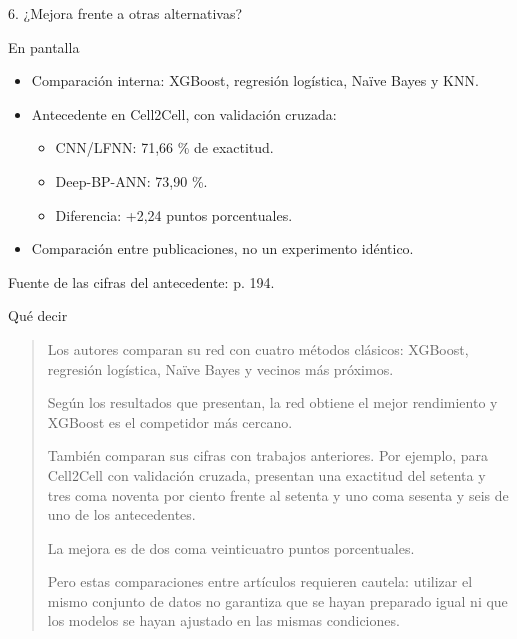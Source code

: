 \documentclass[presentation]{beamer}
\begin{document}
\begin{frame}[label={sec:org3dd62b4}]{6. ¿Mejora frente a otras alternativas?}
\begin{block}{En pantalla}
\begin{itemize}
\item Comparación interna: XGBoost, regresión logística, Naïve Bayes y KNN.
\item Antecedente en Cell2Cell, con validación cruzada:
\begin{itemize}
\item CNN/LFNN: 71,66 \% de exactitud.
\item Deep-BP-ANN: 73,90 \%.
\item Diferencia: +2,24 puntos porcentuales.
\end{itemize}
\item Comparación entre publicaciones, no un experimento idéntico.
\end{itemize}

Fuente de las cifras del antecedente: p. 194.
\end{block}
\begin{block}{Qué decir}
\begin{quote}
Los autores comparan su red con cuatro métodos clásicos: XGBoost, regresión logística, Naïve Bayes y vecinos más próximos.

Según los resultados que presentan, la red obtiene el mejor rendimiento y XGBoost es el competidor más cercano.

También comparan sus cifras con trabajos anteriores. Por ejemplo, para Cell2Cell con validación cruzada, presentan una exactitud del setenta y tres coma noventa por ciento frente al setenta y uno coma sesenta y seis de uno de los antecedentes.

La mejora es de dos coma veinticuatro puntos porcentuales.

Pero estas comparaciones entre artículos requieren cautela: utilizar el mismo conjunto de datos no garantiza que se hayan preparado igual ni que los modelos se hayan ajustado en las mismas condiciones.
\end{quote}
\end{block}
\end{frame}
\end{document}
